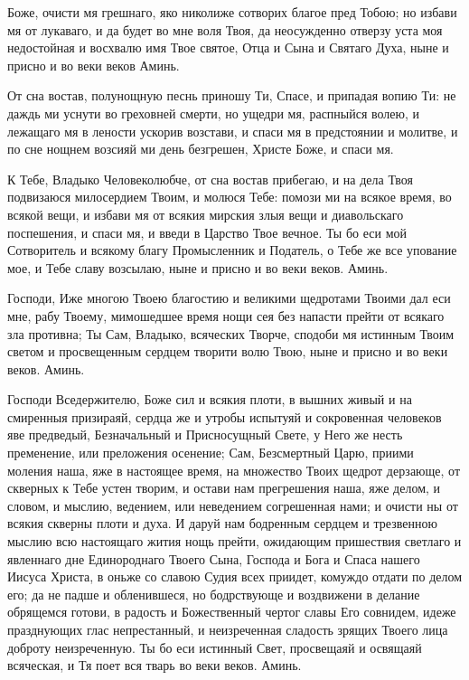 \begin{mymulticols}

\PsalmFifty


\SymbolOfFaith
  

Боже, очисти мя грешнаго, яко николиже сотворих благое пред Тобою; но избави мя от лукаваго, и да будет во мне воля Твоя, да неосужденно отверзу уста моя недостойная и восхвалю имя Твое святое, Отца и Сына и Святаго Духа, ныне и присно и во веки веков Аминь.


От сна востав, полунощную песнь приношу Ти, Спасе, и припадая вопию Ти: не даждь ми уснути во греховней смерти, но ущедри мя, распныйся волею, и лежащаго мя в лености ускорив возстави, и спаси мя в предстоянии и молитве, и по сне нощнем возсияй ми день безгрешен, Христе Боже, и спаси мя.


К Тебе, Владыко Человеколюбче, от сна востав прибегаю, и на дела Твоя подвизаюся милосердием Твоим, и молюся Тебе: помози ми на всякое время, во всякой вещи, и избави мя от всякия мирския злыя вещи и диавольскаго поспешения, и спаси мя, и введи в Царство Твое вечное. Ты бо еси мой Сотворитель и всякому благу Промысленник и Податель, о Тебе же все упование мое, и Тебе славу возсылаю, ныне и присно и во веки веков. Аминь.


Господи, Иже многою Твоею благостию и великими щедротами Твоими дал еси мне, рабу Твоему, мимошедшее время нощи сея без напасти прейти от всякаго зла противна; Ты Сам, Владыко, всяческих Творче, сподоби мя истинным Твоим светом и просвещенным сердцем творити волю Твою, ныне и присно и во веки веков. Аминь.


Господи Вседержителю, Боже сил и всякия плоти, в вышних живый и на смиренныя призираяй, сердца же и утробы испытуяй и сокровенная человеков яве предведый, Безначальный и Присносущный Свете, у Него же несть пременение, или преложения осенение; Сам, Безсмертный Царю, приими моления наша, яже в настоящее время, на множество Твоих щедрот дерзающе, от скверных к Тебе устен творим, и остави нам прегрешения наша, яже делом, и словом, и мыслию, ведением, или неведением согрешенная нами; и очисти ны от всякия скверны плоти и духа. И даруй нам бодренным сердцем и трезвенною мыслию всю настоящаго жития нощь прейти, ожидающим пришествия светлаго и явленнаго дне Единороднаго Твоего Сына, Господа и Бога и Спаса нашего Иисуса Христа, в оньже со славою Судия всех приидет, комуждо отдати по делом его; да не падше и обленившеся, но бодрствующе и воздвижени в делание обрящемся готови, в радость и Божественный чертог славы Его совнидем, идеже празднующих глас непрестанный, и неизреченная сладость зрящих Твоего лица доброту неизреченную. Ты бо еси истинный Свет, просвещаяй и освящаяй всяческая, и Тя поет вся тварь во веки веков. Аминь.


\end{mymulticols}
